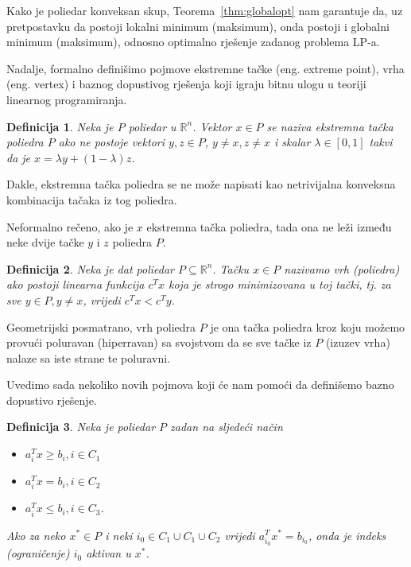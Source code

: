\documentclass[a4paper, utf8, 11pt, colorlinks]{book}
\newtheorem{definition}{Definicija}[chapter]
\theoremstyle{definition}
\begin{document}
 Kako je poliedar konveksan skup, Teorema~\ref{thm:globalopt} nam garantuje da, uz pretpostavku da postoji lokalni minimum (maksimum), onda postoji  i globalni minimum (maksimum), odnosno optimalno rješenje zadanog problema LP-a. 
 
 Nadalje, formalno definišimo pojmove ekstremne tačke (eng. extreme point), vrha (eng. vertex) i baznog dopustivog rješenja koji igraju bitnu ulogu u teoriji linearnog programiranja. 


\begin{definition}
   Neka je $P$ poliedar u $\mathbb{R}^n$.  Vektor $x \in P$ se naziva ekstremna tačka poliedra $P$
   ako ne postoje vektori $y, z \in P$, $y \neq x, z \neq x$ i skalar $\lambda \in [0, 1]$ takvi da je  $x = \lambda y + (1-\lambda)z$.
\end{definition}

Dakle, ekstremna tačka poliedra se ne može napisati kao netrivijalna konveksna kombinacija tačaka iz tog poliedra. 
 
  Neformalno rečeno, ako je  $x$ ekstremna tačka poliedra, tada ona ne leži između neke dvije tačke $y$ i $z$   poliedra $P$.
 
 
\begin{definition}\label{def:vrhPoliedra}
   Neka je dat poliedar $P \subseteq \mathbb{R}^n$. Tačku $x \in P$ nazivamo vrh (poliedra) ako postoji linearna funkcija  $c^T x$ koja je strogo minimizovana u toj tački, tj. za sve  $y\in P, y \neq x$, vrijedi $c^T x < c^T y$. 
\end{definition}
Geometrijski posmatrano,  vrh poliedra $P$ je ona tačka poliedra  kroz koju možemo provući poluravan (hiperravan) sa svojstvom da se sve tačke iz $P$ (izuzev vrha) nalaze sa iste strane te poluravni.

Uvedimo sada nekoliko novih pojmova koji će nam pomoći da definišemo bazno dopustivo rješenje.

\begin{definition}\label{dfn:lp_aktivan}
   Neka je poliedar $P$ zadan na sljedeći način
   \begin{itemize}
       \item $a_i^T x \geq b_i, i \in C_1$
       \item $a_i^T x = b_i, i \in C_2 $
       \item $a_i^T x \leq b_i, i \in C_3 $. 
   \end{itemize}
   Ako za neko $x^* \in P$ i neki $i_0 \in C_1 \cup C_1 \cup C_2$ vrijedi 
   $a_{i_0}^T x^* = b_{i_0}$, onda je indeks (ograničenje) $i_0$ aktivan u $x^*$. 
\end{definition}
\end{document}
